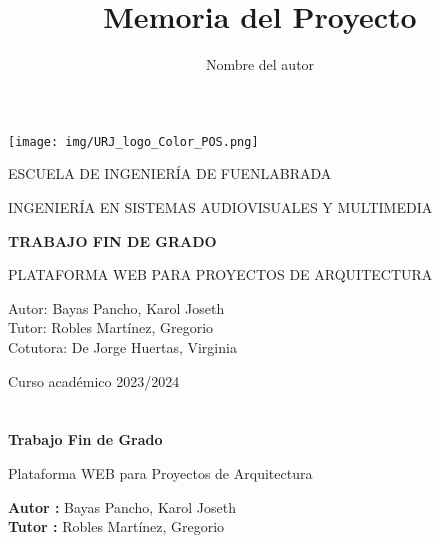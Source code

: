 \documentclass[a4paper, 12pt]{book}
\title{Memoria del Proyecto}
\author{Nombre del autor}
\begin{document}
\renewcommand{\refname}{Bibliografía}  %
\renewcommand{\appendixname}{Apéndice}



\begin{titlepage}
\begin{center}
\texttt{[image: img/URJ\_logo\_Color\_POS.png]}

\vspace{1.75cm}

\LARGE
ESCUELA DE INGENIERÍA DE FUENLABRADA
\vspace{1cm}

\LARGE
INGENIERÍA EN SISTEMAS AUDIOVISUALES Y MULTIMEDIA

\vspace{1cm}
\LARGE
\textbf{TRABAJO FIN DE GRADO}

\vspace{2cm}

\Large
PLATAFORMA WEB PARA PROYECTOS DE ARQUITECTURA

\vspace{2cm}

\large
Autor: Bayas Pancho, Karol Joseth \\
Tutor: Robles Martínez, Gregorio\\
Cotutora: De Jorge Huertas, Virginia 
\vspace{1cm}

\large
Curso académico 2023/2024

\end{center}
\end{titlepage}

\newpage
\mbox{}
\thispagestyle{empty} %



\clearpage
{}
\chapter*{}

\vspace{-4cm}
\begin{center}
\LARGE
\textbf{Trabajo Fin de Grado}

\vspace{1cm}
\large
Plataforma WEB para Proyectos de Arquitectura

\vspace{1cm}
\large
\textbf{Autor :} Bayas Pancho, Karol Joseth \\
\textbf{Tutor :} Robles Martínez, Gregorio

\end{center}
\end{document}

